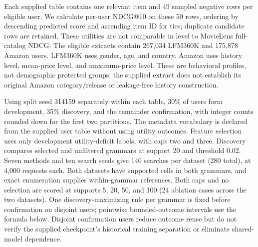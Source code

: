 Each supplied table contains one relevant item and 49 sampled negative rows per eligible user. We calculate per-user NDCG@10 on these 50 rows, ordering by descending predicted score and ascending item ID for ties; duplicate candidate rows are retained. These utilities are not comparable in level to MovieLens full-catalog NDCG. The eligible extracts contain 267,034 LFM360K and 175,878 Amazon users. LFM360K uses gender, age, and country. Amazon uses history level, mean-price level, and maximum-price level. These are behavioral profiles, not demographic protected groups; the supplied extract does not establish its original Amazon category/release or leakage-free history construction.

Using split seed 314159 separately within each table, 30\% of users form development, 35\% discovery, and the remainder confirmation, with integer counts rounded down for the first two partitions. The metadata vocabulary is declared from the supplied user table without using utility outcomes. Feature selection uses only development utility-deficit labels, with caps two and three. Discovery compares selected and unfiltered grammars at support 20 and threshold 0.02. Seven methods and ten search seeds give 140 searches per dataset (280 total), at 4,000 requests each. Both datasets have supported cells in both grammars, and exact enumeration supplies within-grammar references. Both caps and no selection are scored at supports 5, 20, 50, and 100 (24 ablation cases across the two datasets). One discovery-maximizing rule per grammar is fixed before confirmation on disjoint users; pointwise bounded-outcome intervals use the formula below. Disjoint confirmation users reduce outcome reuse but do not verify the supplied checkpoint's historical training separation or eliminate shared-model dependence.

